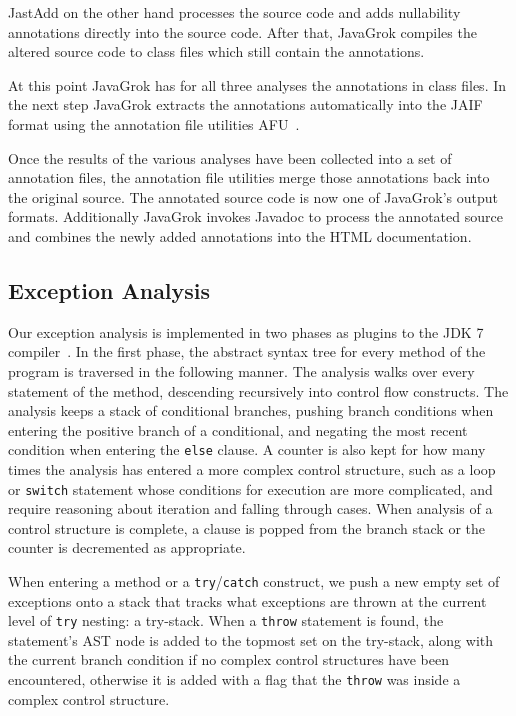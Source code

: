 JastAdd on the other hand processes the source code and adds nullability 
annotations directly into the source code. After that, JavaGrok compiles the 
altered source code to class files which still contain the annotations.

At this point JavaGrok has for all three analyses the annotations in class files.
In the next step JavaGrok extracts the annotations automatically into the JAIF 
format using the annotation file utilities AFU~\cite{AFU}.

Once the results of the various analyses have been collected into a set of
annotation files, the annotation file utilities merge
those annotations back into the original source. The annotated source
code is now one of JavaGrok's output formats. Additionally JavaGrok invokes 
Javadoc to process the annotated source and combines the newly added 
annotations into the HTML documentation.

\subsection{Exception Analysis}
\label{sec:exception_impl}
Our exception analysis is implemented in two phases as plugins to the JDK 7
compiler~\cite{AFU,pluggable}.
In the first phase, the
abstract syntax tree for every method of the program is traversed in the
following manner.  The analysis walks over every statement of the method,
descending recursively into control flow constructs.  The analysis keeps a stack
of conditional branches, pushing branch conditions when entering the positive
branch of a conditional, and negating the most recent condition when entering
the \texttt{else} clause.  A counter is also kept for how many times the
analysis has entered a more complex control structure, such as a loop or
\texttt{switch} statement whose conditions for execution are more complicated,
and require reasoning about iteration and falling through cases.  When
analysis of a control structure is complete, a clause is popped from the
branch stack or the counter is decremented as appropriate.

When entering a method or a \texttt{try}/\texttt{catch} construct, we push a new empty set of exceptions onto
a stack that tracks what exceptions are thrown at the current level of
\texttt{try} nesting: a try-stack.
When a \texttt{throw} statement is found, the statement's AST node is added to the
topmost set on the try-stack, 
along with the current branch condition if no complex control structures have
been encountered, otherwise it is added with a flag that the \texttt{throw} was inside a
complex control structure.

